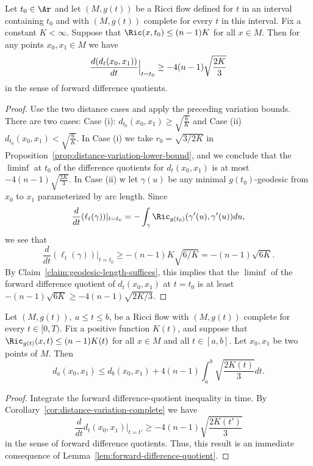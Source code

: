 \begin{corollary}\label{cor:distance-variation-complete}
\label{2ndI.8.3}

Let $t_0\in \Ar$ and let $(M,g(t))$ be a Ricci flow defined for $t$ in an
interval
containing $t_0$ and with $(M,g(t))$ complete for every $t$ in this
interval. Fix a constant $K<\infty$. Suppose that $\Ric(x,t_0)\le (n-1)K$
for all $x\in M$.
 Then for any points $x_0,x_1\in M$ we have
$$\frac{d(d_t(x_0,x_1))}{dt}\Bigl|_{t=t_0}\Bigr.\ge -4(n-1)\sqrt{\frac{2K}{3}}$$
in the sense of forward difference quotients.
\end{corollary}

\begin{proof}
\sketch Use the two distance cases and apply the preceding variation bounds.
There are two cases: Case (i): $d_{t_0}(x_0,x_1)\ge
\sqrt{\frac{6}{K}}$ and Case (ii) $d_{t_0}(x_0,x_1)<
\sqrt{\frac{6}{K}}$. In Case (i) we  take $r_0=\sqrt{3/2K}$ in
Proposition~\ref{prop:distance-variation-lower-bound}, and we conclude that the $\liminf$ at
$t_0$ of the difference quotients for $d_{t}(x_0,x_1)$ is at most
$-4(n-1)\sqrt{\frac{2K}{3}}$. In Case (ii) w let $\gamma(u)$ be any
minimal $g(t_0)$-geodesic from $x_0$ to $x_1$ parameterized by arc
length. Since
$$\frac{d}{dt}(\ell_t(\gamma))|_{t=t_0}=-\int_\gamma
\Ric_{g(t_0)}(\gamma'(u),\gamma'(u))du,$$ we see that
$$\frac{d}{dt}(\ell_t(\gamma))|_{t=t_0}\ge
-(n-1)K\sqrt{6/K}=-(n-1)\sqrt{6K}.$$ By Claim~\ref{claim:geodesic-length-suffices}, this
implies that the $\liminf$ of the forward difference quotient of
$d_t(x_0,x_1)$ at $t=t_0$ is at least $-(n-1)\sqrt{6K}\ge
-4(n-1)\sqrt{2K/3}$.
\end{proof}



\begin{corollary}\label{cor:distance-integral-bound}
\label{corI.8.3}

 Let $(M,g(t)),\ a\le t\le b$, be a Ricci flow with $(M,g(t))$ complete for every $t
\in [0,T)$. Fix a positive function $K(t)$, and suppose that $\Ric_{g(t)}(x,t)\le (n-1)K(t)$ for all $x\in M$ and all $t\in [a,b]$. Let
$x_0,x_1$ be two points of $M$. Then
$$d_a(x_0,x_1)\le d_b(x_0,x_1)+4(n-1)\int_a^b\sqrt{\frac{2K(t)}{3}}dt.$$
\end{corollary}


\begin{proof}
\sketch Integrate the forward difference-quotient inequality in time.
By Corollary~\ref{cor:distance-variation-complete} we have
\begin{equation}\label{liminf}
\frac{d}{dt}d_t(x_0,x_1)|_{t=t'}\ge -4(n-1)\sqrt{\frac{2K(t')}{3}}
\end{equation}
in the sense  of forward difference quotients. Thus, this result is
an immediate consequence of Lemma~\ref{lem:forward-difference-quotient}.
\end{proof}


